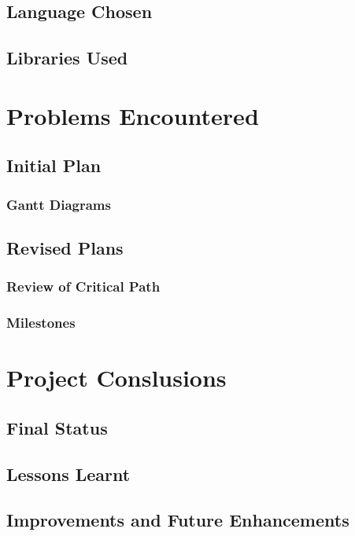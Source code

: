 \documentclass[a4paper,12pt]{report}
\begin{document}
\section{Language Chosen}

\section{Libraries Used}


\chapter{Problems Encountered}

\section{Initial Plan}

\subsection{Gantt Diagrams}

\section{Revised Plans}

\subsection{Review of Critical Path}

\subsection{Milestones}


\chapter{Project Conslusions}

\section{Final Status}

\section{Lessons Learnt}

\section{Improvements and Future Enhancements}
\end{document}

